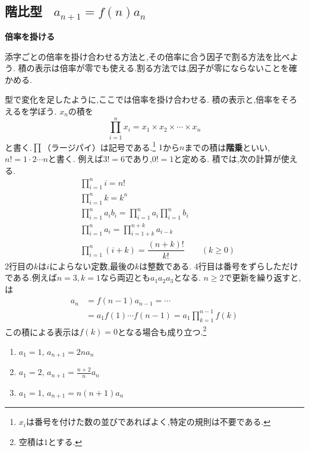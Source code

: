 
  \subsection{\texorpdfstring{階比型 \, $a_{n+1}=f(n)a_n$}{階比型}}\label{節：階比型}
  \begin{bookpoint}
    \textbf{倍率を掛ける}\par
    添字ごとの倍率を掛け合わせる方法と,その倍率に合う因子で割る方法を比べよう.
    積の表示は倍率が零でも使える.割る方法では,因子が零にならないことを確かめる.
  \end{bookpoint}
    型で変化を足したように,ここでは倍率を掛け合わせる.
    積の表示と,倍率をそろえるを学ぼう.
    $x_n$の積を
    \[
      \prod_{i=1}^n x_i
      =x_1\times x_2\times\cdots\times x_n
    \]
    と書く.$\prod$（ラージパイ）は記号である.\footnote{$x_i$は番号を付けた数の並びであればよく,特定の規則は不要である.}
    $1$から$n$までの積は\textbf{階乗}といい,$n!=1\cdot2\cdots n$と書く.
    例えば$3!=6$であり,$0!=1$と定める.
    積では,次の計算が使える.
    \begin{align*}
      &\prod_{i=1}^{n}i=n!\\
      &\prod_{i=1}^{n}k=k^n\\
      &\prod_{i=1}^{n}a_ib_i=\displaystyle\prod_{i=1}^na_i\displaystyle\prod_{i=1}^nb_i\\
      &\prod_{i=1}^{n}a_i=\displaystyle\prod_{i=1+k}^{n+k}a_{i-k}\\
      &\prod_{i=1}^{n}(i+k)=\dfrac{(n+k)!}{k!}\qquad(k\ge0)
    \end{align*}
    2行目の$k$は$i$によらない定数,最後の$k$は整数である.
    4行目は番号をずらしただけである.例えば$n=3,k=1$なら両辺とも$a_1a_2a_3$となる.
    $n\ge2$で更新を繰り返すと,は
    \begin{align*}
      a_n&=f(n-1)a_{n-1}=\cdots\\
         &=a_1f(1)\cdots f(n-1)=a_1\prod_{k=1}^{n-1}f(k)
    \end{align*}
    この積による表示は$f(k)=0$となる場合も成り立つ.\footnote{空積は$1$とする.}
    \noindent {}\par\nobreak
    \begin{enumerate}[label=(\arabic*),parsep=3pt,format=\bookitemlink{example-ratio-1}{problem}{answer}]
      \item $\displaystyle a_1=1,\, a_{n+1}=2na_n$
      \item $\displaystyle a_1=2,\, a_{n+1}=\frac{n+2}{n}a_n$
      \item $\displaystyle a_1=1,\, a_{n+1}=n(n+1)a_n$
    \end{enumerate}


